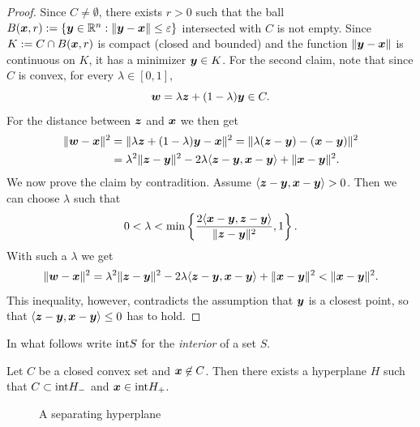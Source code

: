 \begin{proof}
 Since $C\neq \emptyset$, there exists $r>0$ such that the ball $B(\bm{x},r):=\{\bm{y}\in \mathbb{R}^n \mathrel{\mathop{:}} \Vert {\bm{y}-\bm{x}}\Vert\leq \varepsilon\}$ intersected with $C$ is not empty. Since $K:=C\cap B(\bm{x},r)$ is compact (closed and bounded) and the function $\Vert {\bm{y}-\bm{x}}\Vert$ is continuous on $K$, it has a minimizer $\bm{y}\in K$. For the second claim, note that since $C$ is convex, for every $\lambda\in [0,1]$,
 \begin{equation*}
  \bm{w} = \lambda \bm{z}+(1-\lambda)\bm{y} \in C.
 \end{equation*}
For the distance between $\bm{z}$ and $\bm{x}$ we then get
\begin{align*}
 \Vert {\bm{w}-\bm{x}}\Vert^2  &= \Vert {\lambda\bm{z}+(1-\lambda) \bm{y}-\bm{x}}\Vert^2 = \Vert {\lambda (\bm{z}-\bm{y})-(\bm{x}-\bm{y})}\Vert^2\\
 &= \lambda^2\Vert {\bm{z}-\bm{y}}\Vert^2-2\lambda \langle {\bm{z}-\bm{y}}, {\bm{x}-\bm{y}} \rangle+\Vert {\bm{x}-\bm{y}}\Vert^2.
\end{align*}
We now prove the claim by contradition. Assume $\langle {\bm{z}-\bm{y}}, {\bm{x}-\bm{y}} \rangle>0$. Then we can choose $\lambda$ such that
\begin{equation*}
 0< \lambda < \min\left\{ \frac{2\langle {\bm{x}-\bm{y}}, {\bm{z}-\bm{y}} \rangle}{\Vert {\bm{z}-\bm{y}}\Vert^2} , 1\right\}.
\end{equation*}
With such a $\lambda$ we get
\begin{equation*}
 \Vert {\bm{w}-\bm{x}}\Vert^2 = \lambda^2\Vert {\bm{z}-\bm{y}}\Vert^2-2\lambda \langle {\bm{z}-\bm{y}}, {\bm{x}-\bm{y}} \rangle+\Vert {\bm{x}-\bm{y}}\Vert^2 < \Vert {\bm{x}-\bm{y}}\Vert^2.
\end{equation*}
This inequality, however, contradicts the assumption that $\bm{y}$ is a closest point, so that
$\langle {\bm{z}-\bm{y}}, {\bm{x}-\bm{y}} \rangle\leq 0$ has to hold.
\end{proof}

In what follows write ${\operatorname{int}} S$ for the {\em interior} of a set $S$.

\begin{theorem}
 Let $C$ be a closed convex set and $\bm{x}\not\in C$. Then there exists a hyperplane $H$ such that $C\subset {\operatorname{int}} H_-$ and $\bm{x}\in {\operatorname{int}} H_+$. 
\end{theorem}

\begin{figure}[h!]
\centering
{}
\caption{A separating hyperplane}
\end{figure}

